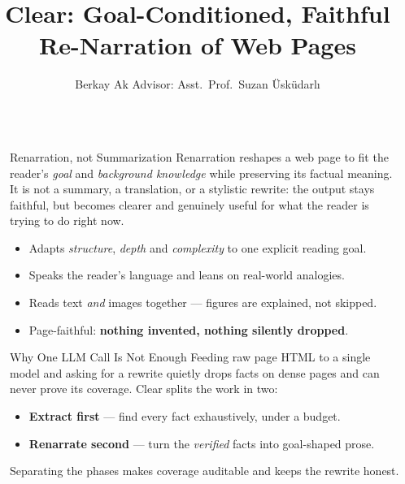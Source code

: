 \documentclass[final]{beamer}
\title{Clear: Goal-Conditioned, Faithful Re-Narration of Web Pages}
\author{{\huge Berkay Ak \quad Advisor: Asst.\ Prof.\ Suzan Üsküdarlı}}
\institute{{\huge CmpE 492 Project — \href{mailto:kerbayak@gmail.com}{kerbayak@gmail.com} — Boğaziçi University}}
\newlength{\sepwid}
\newlength{\onecolwid}
\begin{document}
\setlength{\belowcaptionskip}{2ex}
\setlength\belowdisplayshortskip{2ex}

\begin{frame}[t]
\begin{columns}[t]
\begin{column}{\sepwid}\end{column} %

\begin{column}{\onecolwid}

\begin{block}{Renarration, not Summarization}
Renarration reshapes a web page to fit the reader's \textit{goal} and \textit{background knowledge} while preserving its factual meaning. It is not a summary, a translation, or a stylistic rewrite: the output stays faithful, but becomes clearer and genuinely useful for what the reader is trying to do right now.
\begin{itemize}
\item Adapts \textit{structure}, \textit{depth} and \textit{complexity} to one explicit reading goal.
\item Speaks the reader's language and leans on real-world analogies.
\item Reads text \textit{and} images together — figures are explained, not skipped.
\item Page-faithful: \textbf{nothing invented, nothing silently dropped}.
\end{itemize}
\end{block}

\begin{block}{Why One LLM Call Is Not Enough}
Feeding raw page HTML to a single model and asking for a rewrite quietly drops facts on dense pages and can never prove its coverage. Clear splits the work in two:
\begin{itemize}
\item \textbf{Extract first} — find every fact exhaustively, under a budget.
\item \textbf{Renarrate second} — turn the \textit{verified} facts into goal-shaped prose.
\end{itemize}
Separating the phases makes coverage auditable and keeps the rewrite honest.
\end{block}


\end{column}
\end{columns}
\end{frame}
\end{document}
